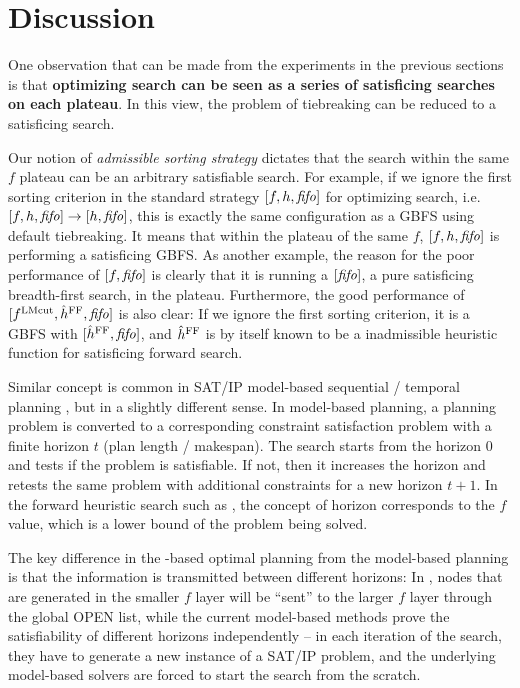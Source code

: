 \clearpage 
\section{Discussion}
\label{sec:discussion}

One observation that can be made from the experiments in the previous sections is that \textbf{optimizing search
can be seen as a series of satisficing searches on each plateau}. In this view, the problem of tiebreaking can be
reduced to a satisficing search.

Our notion of \emph{admissible sorting strategy} dictates that the
search within the same $f$ plateau can be an arbitrary satisfiable search. For example,
if we ignore the first sorting criterion in the standard strategy
$[f,h,{\text{\textit{fifo}}}]$ for optimizing search, i.e. $[f,h,{\text{\textit{fifo}}}] \rightarrow [h,{\text{\textit{fifo}}}]$, this is exactly
the same configuration as a GBFS using \fifo default tiebreaking. It
means that within the plateau of the same $f$, $[f,h,{\text{\textit{fifo}}}]$ is
performing a satisficing GBFS.
As another example, the reason for the poor performance of $[f,{\text{\textit{fifo}}}]$
is clearly that it is running a $[{\text{\textit{fifo}}}]$,
a pure satisficing breadth-first search, in the plateau.
Furthermore, the good performance of $[f^{\text{LMcut}},\hat{h}^{\text{FF}},{\text{\textit{fifo}}}]$ is also clear:
If we ignore the first sorting criterion, it is a GBFS with $[\hat{h}^{\text{FF}},{\text{\textit{fifo}}}]$,
and $\hat{h}^{\text{FF}}$ is by itself known to be a \sota inadmissible heuristic
function for satisficing forward search.

Similar concept is common in SAT/IP model-based sequential / temporal planning
\cite{rintanen2012planning,van2005optiplan}, but in a slightly different sense.  In model-based planning, a
planning problem is converted to a corresponding constraint satisfaction problem with a finite horizon $t$ (plan
length / makespan). The search starts from the horizon 0 and tests if the problem is satisfiable. If not, then it
increases the horizon and retests the same problem with additional constraints for a new horizon $t+1$. In the
forward heuristic search such as \astar, the concept of horizon corresponds to the $f$ value, which is a lower
bound of the problem being solved.

The key difference in the \astar-based optimal planning from the model-based planning is
that the information is transmitted between different horizons:
In \astar, nodes that are generated in the smaller
$f$ layer will be ``sent'' to the larger $f$ layer through the global OPEN
list, while the current model-based methods prove the satisfiability of
different horizons independently -- in each iteration of the search,
they have to generate a new instance of a SAT/IP problem, and the
underlying model-based solvers are forced to start the search from the scratch.

